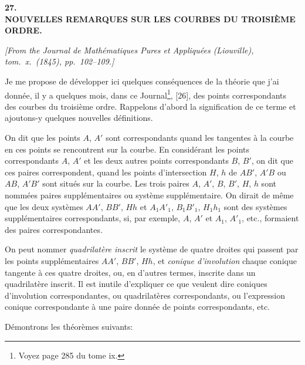 \documentclass[12pt,a4paper]{article}
\begin{document}
\newpage
\setcounter{page}{190}

\begin{center}
\textbf{\Large 27.}\\[1em]
\textbf{\Large NOUVELLES REMARQUES SUR LES COURBES DU TROISI\`EME ORDRE.}
\end{center}

\textit{[From the Journal de Math\'ematiques Pures et Appliqu\'ees (Liouville), tom.~x.~(1845), pp.~102--109.]}

\bigskip

Je me propose de d\'evelopper ici quelques cons\'equences de la th\'eorie que j'ai donn\'ee, il y a quelques mois, dans ce Journal\footnote{Voyez page 285 du tome ix.}, [26], des points correspondants des courbes du troisi\`eme ordre. Rappelons d'abord la signification de ce terme et ajoutons-y quelques nouvelles d\'efinitions.

On dit que les points $A$, $A'$ sont correspondants quand les tangentes \`a la courbe en ces points se rencontrent sur la courbe. En consid\'erant les points correspondants $A$, $A'$ et les deux autres points correspondants $B$, $B'$, on dit que ces paires correspondent, quand les points d'intersection $H$, $h$ de $AB'$, $A'B$ ou $AB$, $A'B'$ sont situ\'es sur la courbe. Les trois paires $A$, $A'$, $B$, $B'$, $H$, $h$ sont nomm\'ees paires suppl\'ementaires ou syst\`eme suppl\'ementaire. On dirait de m\^eme que les deux syst\`emes $AA'$, $BB'$, $Hh$ et $A_1 A'_1$, $B_1 B'_1$, $H_1 h_1$ sont des syst\`emes suppl\'ementaires correspondants, si, par exemple, $A$, $A'$ et $A_1$, $A'_1$, etc., formaient des paires correspondantes.

On peut nommer \textit{quadrilat\`ere inscrit} le syst\`eme de quatre droites qui passent par les points suppl\'ementaires $AA'$, $BB'$, $Hh$, et \textit{conique d'involution} chaque conique tangente \`a ces quatre droites, ou, en d'autres termes, inscrite dans un quadrilat\`ere inscrit. Il est inutile d'expliquer ce que veulent dire coniques d'involution correspondantes, ou quadrilat\`eres correspondants, ou l'expression conique correspondante \`a une paire donn\'ee de points correspondants, etc.

D\'emontrons les th\'eor\`emes suivants:
\end{document}
